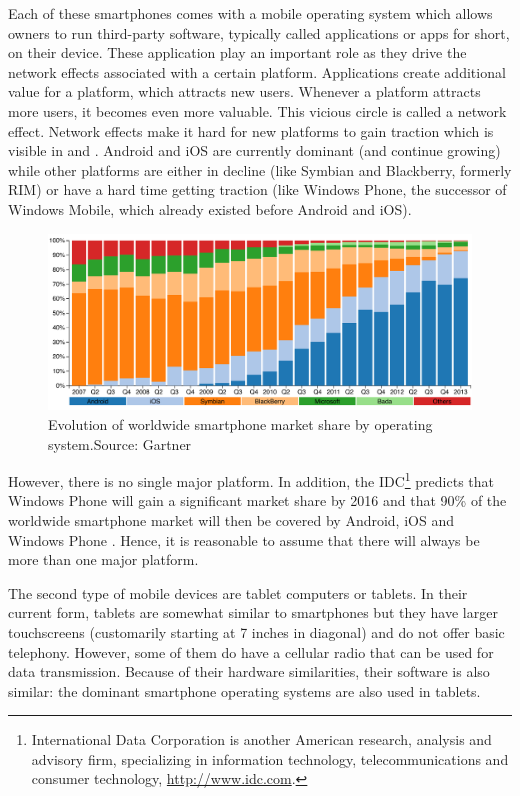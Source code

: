 Each of these smartphones comes with a mobile operating system which allows owners to run third-party software, typically called applications or apps for short, on their device. These application play an important role as they drive the network effects associated with a certain platform. Applications create additional value for a platform, which attracts new users. Whenever a platform attracts more users, it becomes even more valuable. This vicious circle is called a network effect. Network effects make it hard for new platforms to gain traction which is visible in  and . Android and iOS are currently dominant (and continue growing) while other platforms are either in decline (like Symbian and Blackberry, formerly RIM) or have a hard time getting traction (like Windows Phone, the successor of Windows Mobile, which already existed before Android and iOS).

\begin{figure}[h]
    \centering
    \includegraphics[width=\textwidth]{../resources/figs/smartphone_share.pdf}
    \caption{Evolution of worldwide smartphone market share by operating system.\newline Source: Gartner \citeGartner}
    \label{fig:smartphone-share}
\end{figure}

However, there is no single major platform. In addition, the IDC\footnote{International Data Corporation is another American research, analysis and advisory firm, specializing in information technology, telecommunications and consumer technology, \url{http://www.idc.com}.} predicts that Windows Phone will gain a significant market share by 2016 and that 90\% of the worldwide smartphone market will then be covered by Android, iOS and Windows Phone \cite{IDC:phone}. Hence, it is reasonable to assume that there will always be more than one major platform.

The second type of mobile devices are tablet computers or tablets. In their current form, tablets are somewhat similar to smartphones but they have larger touchscreens (customarily starting at 7 inches in diagonal) and do not offer basic telephony. However, some of them do have a cellular radio that can be used for data transmission. Because of their hardware similarities, their software is also similar: the dominant smartphone operating systems are also used in tablets.

